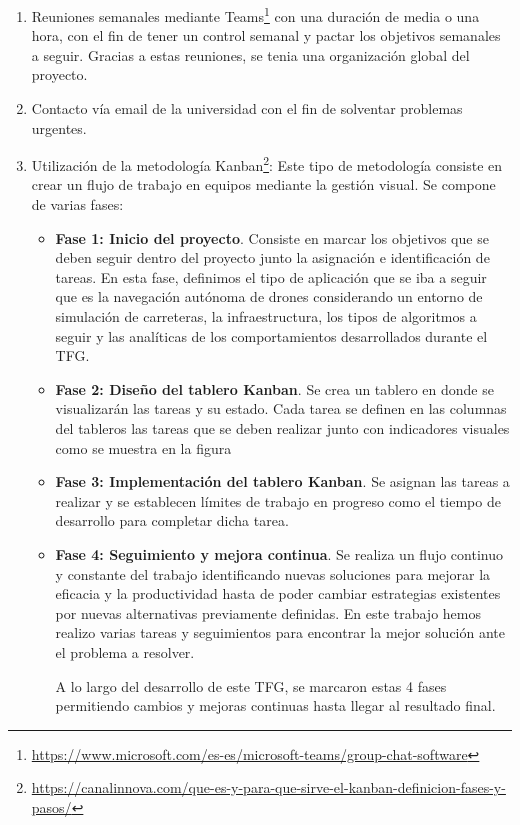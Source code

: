 \begin{enumerate}
    \item Reuniones semanales mediante Teams\footnote{\url{https://www.microsoft.com/es-es/microsoft-teams/group-chat-software}} con una duración de media o una hora, con el fin de tener un control semanal y pactar los objetivos semanales a seguir. Gracias a estas reuniones, se tenia una organización global del proyecto. 
    \item Contacto vía email de la universidad con el fin de solventar problemas urgentes. 
    \item Utilización de la metodología Kanban\footnote{\url{https://canalinnova.com/que-es-y-para-que-sirve-el-kanban-definicion-fases-y-pasos/}}: Este tipo de metodología consiste en crear un flujo de trabajo
    en equipos mediante la gestión visual. Se compone de varias fases:
  
    \begin{itemize}
      \item \textbf{Fase 1: Inicio del proyecto}. Consiste en marcar los objetivos que se deben seguir dentro del proyecto junto la asignación e identificación de tareas. En esta fase, 
      definimos el tipo de aplicación que se iba a seguir que es la navegación autónoma de drones considerando un entorno de simulación de carreteras, la infraestructura, los tipos 
      de algoritmos a seguir y las analíticas de los comportamientos desarrollados durante el TFG. 
      \item \textbf{Fase 2: Diseño del tablero Kanban}. Se crea un tablero en donde se visualizarán las tareas y su estado. Cada tarea se definen en las columnas del tableros las
      tareas que se deben realizar junto con indicadores visuales como se muestra en la figura 
      \item \textbf{Fase 3: Implementación del tablero Kanban}. Se asignan las tareas a realizar y se establecen límites de trabajo en progreso como el tiempo de desarrollo para 
      completar dicha tarea. 
      \item \textbf{Fase 4: Seguimiento y mejora continua}. Se realiza un flujo continuo y constante del trabajo identificando nuevas soluciones para mejorar la eficacia y la 
      productividad hasta de poder cambiar estrategias existentes por nuevas alternativas previamente definidas. En este trabajo hemos realizo varias tareas y seguimientos para encontrar
      la mejor solución ante el problema a resolver.

      
      A lo largo del desarrollo de este TFG, se marcaron estas 4 fases permitiendo cambios y mejoras continuas hasta llegar al resultado final.


\end{itemize}
\end{enumerate}
